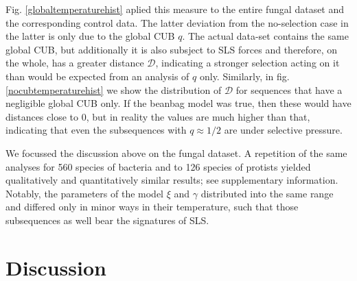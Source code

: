 \documentclass[a4paper,10pt]{paper}%
\begin{document}
 Fig. \ref{globaltemperaturehist} aplied this measure to  the entire fungal dataset and the corresponding control data.  The latter  deviation from the no-selection case in the latter is only due to the global CUB $q$. The actual data-set contains the same global CUB, but additionally it is also subsject to SLS forces and therefore, on the whole, has a greater distance $\mathcal D$, indicating a stronger selection acting on it than would be expected from an analysis of $q$ only.  Similarly, in fig. \ref{nocubtemperaturehist} we show  the distribution of $\mathcal D$ for sequences that have a negligible global CUB only. If the beanbag model was true, then these would have distances close to $0$, but in reality the values are much higher than that, indicating that even the subsequences with  $q\approx 1/2$ are under selective pressure. 
\par
We focussed the discussion above on the fungal dataset. A repetition of the same analyses   for  560 species of bacteria and to 126 species of protists  yielded qualitatively and quantitatively similar results; see supplementary information.    Notably, the parameters of the model $\xi$ and $\gamma$ distributed into the same range and differed only in minor ways in their temperature, such that those subsequences as well bear the signatures of SLS.

\section{Discussion}
\end{document}
